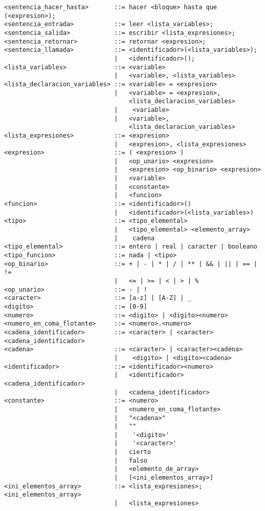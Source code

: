 \begin{verbatim}
<sentencia_hacer_hasta>       ::= hacer <bloque> hasta que (<expresion>);
<sentencia_entrada>           ::= leer <lista_variables>;
<sentencia_salida>            ::= escribir <lista_expresiones>;
<sentencia_retornar>          ::= retornar <expresion>;
<sentencia_llamada>           ::= <identificador>(<lista_variables>);
                              |   <identificador>();
<lista_variables>             ::= <variable>
                              |   <variable>, <lista_variables>
<lista_declaracion_variables> ::= <variable> = <expresion>
                              |   <variable> = <expresion>,     
                                  <lista_declaracion_variables>
                              |    <variable>
                              |   <variable>,     
                                  <lista_declaracion_variables>
<lista_expresiones>           ::= <expresion>
                              |   <expresion>, <lista_expresiones>
<expresion>                   ::= ( <expresion> )
                              |   <op_unario> <expresion>
                              |   <expresion> <op_binario> <expresion>
                              |   <variable>
                              |   <constante>
                              |   <funcion>
<funcion>                     ::= <identificador>()
                              |   <identificador>(<lista_variables>)
<tipo>                        ::= <tipo_elemental>
                              |   <tipo_elemental> <elemento_array>
                              |    cadena
<tipo_elemental>              ::= entero | real | caracter | booleano
<tipo_funcion>                ::= nada | <tipo>
<op_binario>                  ::= + | - | * | / | ** | && | || | == | !=
                              |   <= | >= | < | > | %
<op_unario>                   ::= - | !
<caracter>                    ::= [a-z] | [A-Z] | _
<digito>                      ::= [0-9]
<numero>                      ::= <digito> | <digito><numero>
<numero_en_coma_flotante>     ::= <numero>.<numero>
<cadena_identificador>        ::= <caracter> | <caracter><cadena_identificador>
<cadena>                      ::= <caracter> | <caracter><cadena>
                              |    <digito> | <digito><cadena>
<identificador>               ::= <identificador><numero>
                              |   <identificador><cadena_identificador>
                              |   <cadena_identificador>
<constante>                   ::= <numero>
                              |   <numero_en_coma_flotante>
                              |   "<cadena>"
                              |   ""
                              |    '<digito>'
                              |    '<caracter>'
                              |   cierto
                              |   falso
                              |   <elemento_de_array>
                              |   [<ini_elementos_array>]
<ini_elementos_array>         ::= <lista_expresiones>; <ini_elementos_array>
                              |   <lista_expresiones>
\end{verbatim}


